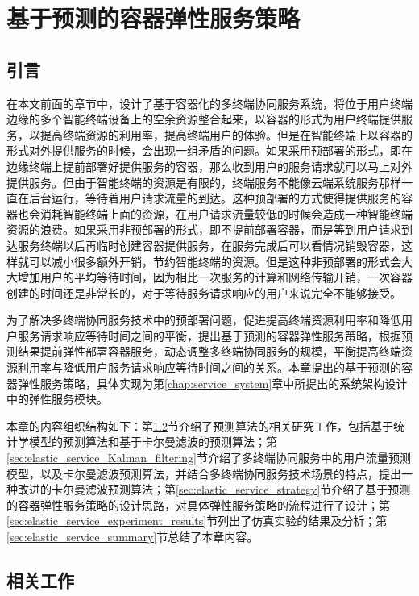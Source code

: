 \chapter{基于预测的容器弹性服务策略 }\label{chap:elastic_service}

\section{引言}

在本文前面的章节中，设计了基于容器化的多终端协同服务系统，将位于用户终端边缘的多个智能终端设备上的空余资源整合起来，以容器的形式为用户终端提供服务，以提高终端资源的利用率，提高终端用户的体验。但是在智能终端上以容器的形式对外提供服务的时候，会出现一组矛盾的问题。如果采用预部署的形式，即在边缘终端上提前部署好提供服务的容器，那么收到用户的服务请求就可以马上对外提供服务。但由于智能终端的资源是有限的，终端服务不能像云端系统服务那样一直在后台运行，等待着用户请求流量的到达。这种预部署的方式使得提供服务的容器也会消耗智能终端上面的资源，在用户请求流量较低的时候会造成一种智能终端资源的浪费。如果采用非预部署的形式，即不提前部署容器，而是等到用户请求到达服务终端以后再临时创建容器提供服务，在服务完成后可以看情况销毁容器，这样就可以减小很多额外开销，节约智能终端的资源。但是这种非预部署的形式会大大增加用户的平均等待时间，因为相比一次服务的计算和网络传输开销，一次容器创建的时间还是非常长的，对于等待服务请求响应的用户来说完全不能够接受。

为了解决多终端协同服务技术中的预部署问题，促进提高终端资源利用率和降低用户服务请求响应等待时间之间的平衡，提出基于预测的容器弹性服务策略，根据预测结果提前弹性部署容器服务，动态调整多终端协同服务的规模，平衡提高终端资源利用率与降低用户服务请求响应等待时间之间的关系。本章提出的基于预测的容器弹性服务策略，具体实现为第\ref{chap:service_system}章中所提出的系统架构设计中的弹性服务模块。

本章的内容组织结构如下：第\ref{sec:elastic_service_related_work}节介绍了预测算法的相关研究工作，包括基于统计学模型的预测算法和基于卡尔曼滤波的预测算法；第\ref{sec:elastic_service_Kalman_filtering}节介绍了多终端协同服务中的用户流量预测模型，以及卡尔曼滤波预测算法，并结合多终端协同服务技术场景的特点，提出一种改进的卡尔曼滤波预测算法；第\ref{sec:elastic_service_strategy}节介绍了基于预测的容器弹性服务策略的设计思路，对具体弹性服务策略的流程进行了设计；第\ref{sec:elastic_service_experiment_results}节列出了仿真实验的结果及分析；第\ref{sec:elastic_service_summary}节总结了本章内容。

\section{相关工作}\label{sec:elastic_service_related_work}

